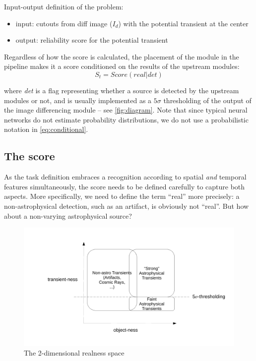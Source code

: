 Input-output definition of the problem:
\begin{itemize}
  \item input: cutouts from diff image ($I_d$) with the potential transient at the center
  \item output: reliability score for the potential transient
\end{itemize}


Regardless of how the score is calculated, the placement of the module in the pipeline makes it a score conditioned on the results of the upstream modules:
\begin{equation}
  \label{eq:conditional}
  S_t =  Score(real | det)
\end{equation}

where \emph{det} is a flag representing whether a source is detected by the upstream modules or not, and is usually implemented as a $5\sigma$ thresholding of the output of the image differencing module -- see \cref{fig:diagram}. Note that since typical neural networks do not estimate probability distributions, we do not use a probabilistic notation in \cref{eq:conditional}.


\subsection{The score}
As the task definition embraces a recognition according to spatial \emph{and} temporal features simultaneously, the score needs to be defined carefully to capture both aspects.
More specifically, we need to define the term ``real'' more precisely: a non-astrophysical detection, such as an artifact, is obviously not ``real''. But how about a non-varying astrophysical source?

\begin{figure}[h]
  \centering
  \includegraphics[width=.8\textwidth]{material/score-space}
  \caption{The 2-dimensional realness space}
  \label{fig:score-space}
\end{figure}

